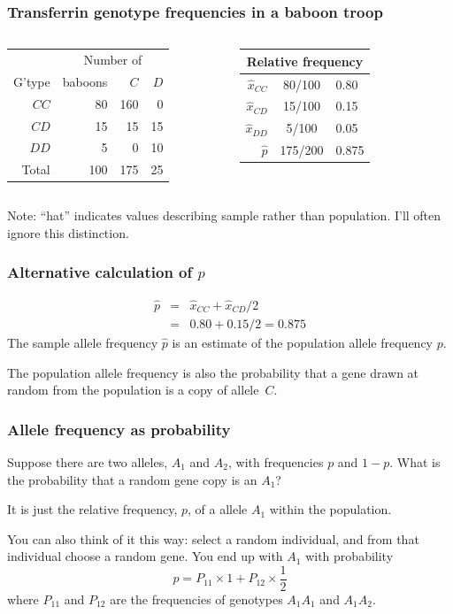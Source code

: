 \documentclass[12pt]{beamer}
\begin{document}
\begin{frame}
\frametitle{Transferrin genotype frequencies in a baboon troop}
\begin{columns}
\begin{tabular}{rrrr}
        &\multicolumn{3}{c}{Number of}\\ \cline{2-4}
G'type& baboons &$C$&$D$\\ \hline
$CC$    &  80 & 160&  0\\
$CD$    &  15 &  15& 15\\
$DD$    &   5 &   0& 10\\ \hline
Total   & 100 & 175& 25\\
\end{tabular}
\begin{tabular}{r@{$\;=\;$}c@{$\;=\;$}l}
\multicolumn{3}{c}{Relative frequency}\\ \hline
$\hat x_{CC}$&80/100&0.80\\
$\hat x_{CD}$&15/100&0.15\\
$\hat x_{DD}$& 5/100&0.05\\
$\hat p$ & 175/200 & 0.875
\end{tabular}
\end{columns}

\bigskip
\pause
Note: ``hat'' indicates values describing sample rather than
population.
\pause
I'll often ignore this distinction.
\end{frame}

\begin{frame}
\frametitle{Alternative calculation of $p$}
\begin{eqnarray*}
\hat p &=& \hat x_{CC} + \hat x_{CD}/2\\
&=& 0.80 + 0.15/2 = 0.875
\end{eqnarray*}
The sample allele frequency $\hat p$ is an estimate of the population allele
frequency $p$.

\bigskip

The population allele frequency is also the probability that a gene drawn at
random from the population is a copy of allele~$C$.
\end{frame}

\begin{frame}
\frametitle{Allele frequency as probability}
Suppose there are two alleles, $A_1$ and $A_2$, with frequencies $p$
and $1-p$. What is the probability that a random gene copy is an
$A_1$? 

\bigskip
\pause

It is just the relative frequency, $p$, of a allele $A_1$ within the population.

\bigskip
\pause

You can also think of it this way: select a random individual, and
from that individual choose a random gene. You end up with $A_1$ with
probability 
\[
p = P_{11}\times 1 + P_{12}\times\frac{1}{2}
\]
where $P_{11}$ and $P_{12}$ are the frequencies of genotypes $A_1A_1$
and $A_1A_2$.
\end{frame}
\end{document}
